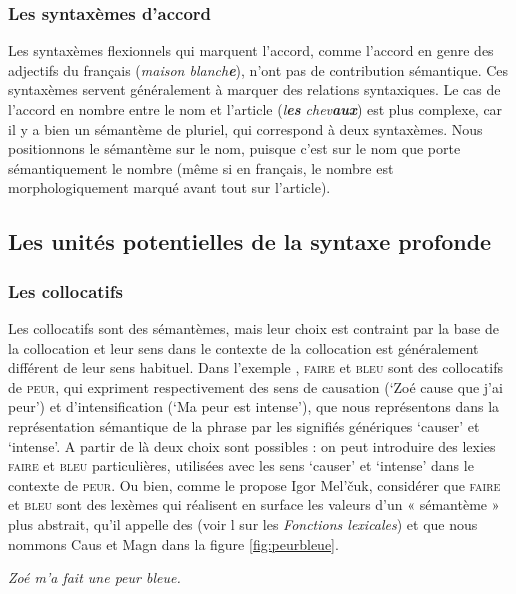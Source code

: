 \subsubsection{Les syntaxèmes d’accord} 
Les syntaxèmes flexionnels qui marquent l’accord, comme l’accord en genre des adjectifs du français (\textit{maison blanch\textbf{e}}), n’ont pas de contribution sémantique. Ces syntaxèmes servent généralement à marquer des relations syntaxiques. Le cas de l’accord en nombre entre le nom et l’article (\textit{l\textbf{es} chev\textbf{aux}}) est plus complexe, car il y a bien un sémantème de pluriel, qui correspond à deux syntaxèmes. Nous positionnons le sémantème sur le nom, puisque c’est sur le nom que porte sémantiquement le nombre (même si en français, le nombre est morphologiquement marqué avant tout sur l’article).

\subsection{Les unités potentielles de la syntaxe profonde}\label{sec:13-potentiel}

\subsubsection{Les collocatifs}
Les collocatifs sont des sémantèmes, mais leur choix est contraint par la base de la collocation et leur sens dans le contexte de la collocation est généralement différent de leur sens habituel. Dans l’exemple , \textsc{faire} et \textsc{bleu} sont des collocatifs de \textsc{peur}, qui expriment respectivement des sens de causation (‘Zoé cause que j’ai peur’) et d’intensification (‘Ma peur est intense’), que nous représentons dans la représentation sémantique de la phrase par les signifiés génériques ‘causer’ et ‘intense’. A partir de là deux choix sont possibles : on peut introduire des lexies \textsc{faire} et \textsc{bleu} particulières, utilisées avec les sens ‘causer’ et ‘intense’ dans le contexte de \textsc{peur}. Ou bien, comme le propose Igor Mel’čuk, considérer que \textsc{faire} et \textsc{bleu} sont des lexèmes qui réalisent en surface les valeurs d’un « sémantème » plus abstrait, qu’il appelle des  (voir l sur les \textit{Fonctions lexicales}) et que nous nommons Caus et Magn dans la figure \ref{fig:peurbleue}.

\ea\label{ex:peurbleue} \textit{Zoé m’a fait une peur bleue.}\z

